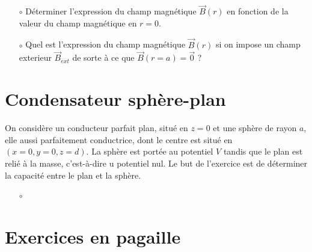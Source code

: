 \documentclass{report}
\begin{document}
\begin{itemize}

	\item[$\circ$] Déterminer l'expression du champ magnétique $\vec{B}(r)$ en fonction de la valeur du champ magnétique en $r=0$.
	\item[$\circ$] Quel est l'expression du champ magnétique $\vec{B}(r)$ si on impose un champ exterieur $\vec{B}_{ext}$ de sorte à ce que  $\vec{B}(r=a)=\vec{0}$ ?

\end{itemize}

\newpage

\section*{Condensateur sphère-plan}

On considère un conducteur parfait plan, situé en $z=0$ et une sphère de rayon $a$, elle aussi parfaitement conductrice, dont le centre est situé en $(x=0, y=0, z=d)$. La sphère est portée au potentiel $V$ tandis que le plan est relié à la masse, c'est-à-dire u potentiel nul. Le but de l'exercice est de déterminer la capacité entre le plan et la sphère.

\begin{itemize}

	\item[$\circ$] 

\end{itemize}

\newpage

\section*{Exercices en pagaille}
\end{document}
